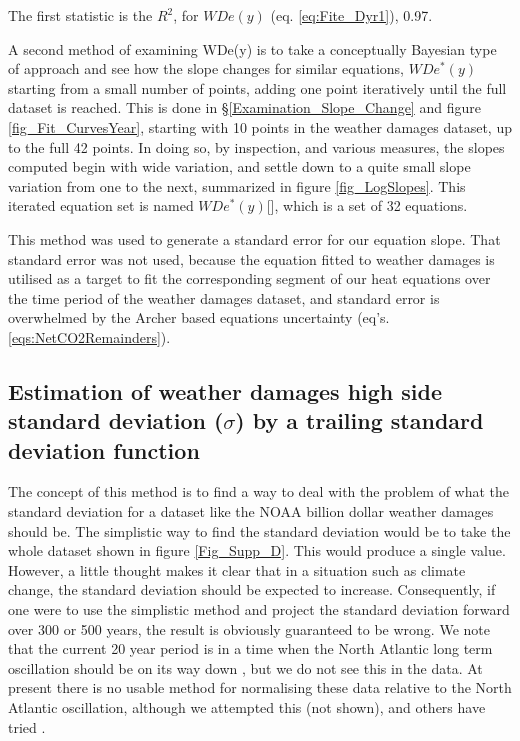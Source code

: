 \documentclass{article}
\begin{document}
The first statistic is the $R^2$, for $WDe(y)$ (eq. \ref{eq:Fite_Dyr1}), 0.97. 

A second method of examining WDe(y) is to take a conceptually Bayesian type of approach and see how the slope changes for similar equations, $WDe^*(y)$ starting from a small number of points, adding one point iteratively until the full dataset is reached. This is done in \S \ref{Examination_Slope_Change} and figure \ref{fig_Fit_CurvesYear}, starting with 10 points in the weather damages dataset, up to the full 42 points. In doing so, by inspection, and various measures, the slopes computed begin with wide variation, and settle down to a quite small slope variation from one to the next, summarized in figure \ref{fig_LogSlopes}. This iterated equation set is named $WDe^*(y)$[], which is a set of 32 equations. 

This method was used to generate a standard error for our equation slope. That standard error was not used, because the equation fitted to weather damages is utilised as a target to fit the corresponding segment of our heat equations over the time period of the weather damages dataset, and standard error is overwhelmed by the Archer based equations uncertainty (eq's. \ref{eqs:NetCO2Remainders}). 


\subsection{Estimation of weather damages high side standard deviation ($\sigma$) by a trailing standard deviation function }
\label{EstimationOfsigmafunction}
The concept of this method is to find a way to deal with the problem of what the standard deviation for a dataset like the NOAA billion dollar weather damages \cite{NOAAbillionDlr} should be. The simplistic way to find the standard deviation would be to take the whole dataset shown in figure \ref{Fig_Supp_D}. This would produce a single value. However, a little thought makes it clear that in a situation such as climate change, the standard deviation should be expected to increase. Consequently, if one were to use the simplistic method and project the standard deviation  forward over 300 or 500 years, the result is obviously guaranteed to be wrong. We note that the current 20 year period is in a time when the North Atlantic long term oscillation should be on its way down \cite{Hansen2023WarmingInPipeline}, but we do not see this in the data. At present there is no usable method for normalising these data relative to the North Atlantic oscillation, although we attempted this (not shown), and others have tried \cite{Loder-Garrett1978_18.6yearCycle,Hachey1948TrendsCyclesSSTCanadianAtlantic,ELLIS2016ModulationIceAges_viaPrecessionAndDust-albedoFeedbacks}. 
\end{document}
